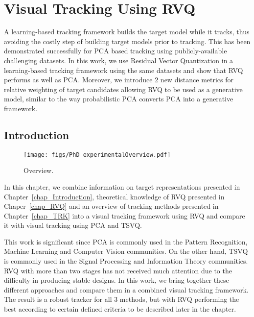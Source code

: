 \chapter{Visual Tracking Using RVQ}
\label{chap_RVQ_TRK}	

A learning-based tracking framework builds the target model while it tracks, thus avoiding the costly step of building target models prior to tracking.  This has been demonstrated successfully for PCA based tracking using publicly-available challenging datasets.  In this work, we use Residual Vector Quantization in a learning-based tracking framework using the same datasets and show that RVQ performs as well as PCA.  Moreover, we introduce 2 new distance metrics for relative weighting of target candidates allowing RVQ to be used as a generative model, similar to the way probabilistic PCA converts PCA into a generative framework.

\section{Introduction}
								\begin{figure}[t]
								\centering
								\texttt{[image: figs/PhD\_experimentalOverview.pdf]}
								\caption{Overview.}
								\label{fig:overview}
								\end{figure}

In this chapter, we combine information on target representations presented in Chapter~\ref{chap_Introduction}, theoretical knowledge of RVQ presented in Chaper~\ref{chap_RVQ} and an overview of tracking methods presented in Chapter~\ref{chap_TRK} into a visual tracking framework using RVQ and compare it with visual tracking using PCA and TSVQ.  

This work is significant since PCA is commonly used in the Pattern Recognition, Machine Learning and Computer Vision communities.  On the other hand, TSVQ is commonly used in the Signal Processing and Information Theory communities.  RVQ with more than two stages has not received much attention due to the difficulty in producing stable designs.  In this work, we bring together these different approaches and compare them in a combined visual tracking framework.  The result is a robust tracker for all 3 methods, but with RVQ performing the best according to certain defined criteria to be described later in the chapter.



